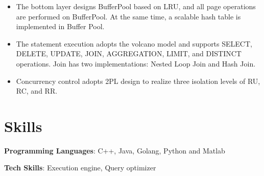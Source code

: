 \documentclass{chicv}
\begin{document}
\begin{itemize}
	\item The bottom layer designs BufferPool based on LRU, and all page operations are performed on BufferPool. At the same time, a scalable hash table is implemented in Buffer Pool.
	\item The statement execution adopts the volcano model and supports SELECT, DELETE, UPDATE, JOIN, AGGREGATION, LIMIT, and DISTINCT operations. Join has two implementations: Nested Loop Join and Hash Join.
	\item Concurrency control adopts 2PL design to realize three isolation levels of RU, RC, and RR.
\end{itemize}

\section{Skills}

\begin{compactlist}
  \item \textbf{Programming Languages}: C++, Java, Golang, Python and Matlab
  \item \textbf{Tech Skills}: Execution engine, Query optimizer
\end{compactlist}
\end{document}

